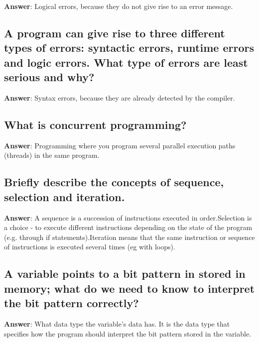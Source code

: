 \documentclass[a4paper,11pt,oneside]{article}
\begin{document}
\begin{sloppypar}
\label{q:202:sa:en:True}

\textbf{Answer}: Logical errors, because they do not give rise to an error message.



\subsection{A program can give rise to three different types of errors: syntactic errors, runtime errors and logic errors. What type of errors are least serious and why?}

\label{q:203:sa:en:True}

\textbf{Answer}: Syntax errors, because they are already detected by the compiler.



\subsection{What is concurrent programming?}

\label{q:204:sa:en:True}

\textbf{Answer}: Programming where you program several parallel execution paths (threads) in the same program.



\subsection{Briefly describe the concepts of sequence, selection and iteration.}

\label{q:205:sa:en:True}

\textbf{Answer}: A sequence is a succession of instructions executed in order.Selection is a choice - to execute different instructions depending on the state of the program (e.g. through if statements).Iteration means that the same instruction or sequence of instructions is executed several times (eg with loops).



\subsection{A variable points to a bit pattern in stored in memory; what do we need to know to interpret the bit pattern correctly?}

\label{q:206:sa:en:True}

\textbf{Answer}: What data type the variable's data has. It is the data type that specifies how the program should interpret the bit pattern stored in the variable.




\end{sloppypar}
\end{document}
